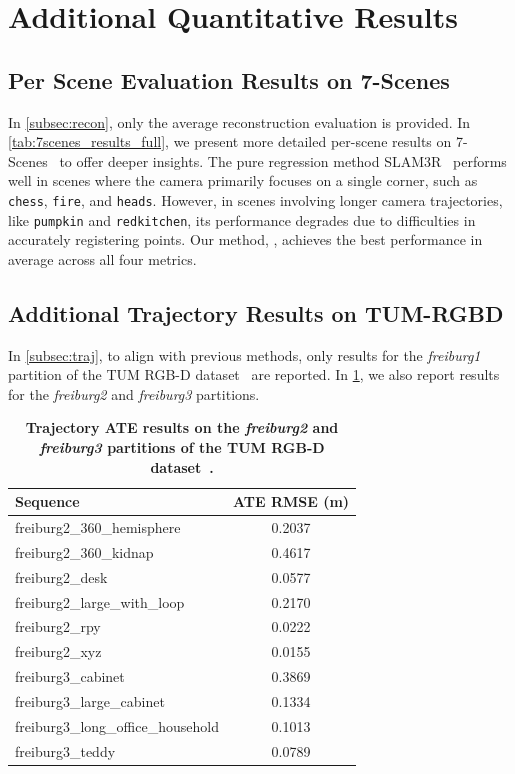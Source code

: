 \section{Additional Quantitative Results}

\subsection{Per Scene Evaluation Results on 7-Scenes}
In \cref{subsec:recon}, only the average reconstruction evaluation is provided. In \cref{tab:7scenes_results_full}, we present more detailed per-scene results on 7-Scenes~\cite{shotton2013-7scenes} to offer deeper insights. The pure regression method SLAM3R~\cite{liu2025slam3r} performs well in scenes where the camera primarily focuses on a single corner, such as \texttt{chess}, \texttt{fire}, and \texttt{heads}. However, in scenes involving longer camera trajectories, like \texttt{pumpkin} and \texttt{redkitchen}, its performance degrades due to difficulties in accurately registering points. Our method, \ours, achieves the best performance in average across all four metrics.

\subsection{Additional Trajectory Results on TUM-RGBD}
In \cref{subsec:traj}, to align with previous methods, only results for the \textit{freiburg1} partition of the TUM RGB-D dataset~\cite{sturm12tumrgbd} are reported. In \cref{tab:traj_tumrgbd_more}, we also report results for the \textit{freiburg2} and \textit{freiburg3} partitions.

\begin{table}[h]
    \centering
    \begin{tabular}{l c}
        \toprule
        \textbf{Sequence} & \textbf{ATE RMSE (m)} \\
        \midrule
        freiburg2\_360\_hemisphere        & 0.2037 \\
        freiburg2\_360\_kidnap            & 0.4617 \\
        freiburg2\_desk                   & 0.0577 \\
        freiburg2\_large\_with\_loop      & 0.2170 \\
        freiburg2\_rpy                    & 0.0222 \\
        freiburg2\_xyz                    & 0.0155 \\
        \midrule
        freiburg3\_cabinet                & 0.3869 \\
        freiburg3\_large\_cabinet         & 0.1334 \\
        freiburg3\_long\_office\_household & 0.1013 \\
        freiburg3\_teddy                  & 0.0789 \\
        \bottomrule
    \end{tabular}
    \caption{\bf Trajectory ATE results on the \textit{freiburg2} and \textit{freiburg3} partitions of the TUM RGB-D dataset~\cite{sturm12tumrgbd}.}
        \label{tab:traj_tumrgbd_more}
\end{table}




